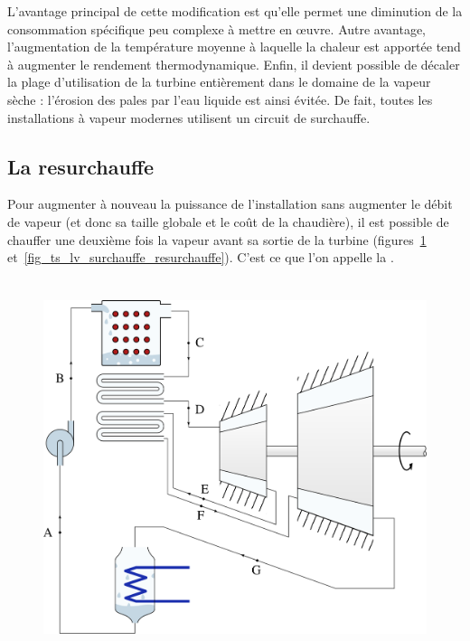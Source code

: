 		L’avantage principal de cette modification est qu’elle permet une diminution de la consommation spécifique peu complexe à mettre en œuvre. Autre avantage, l’augmentation de la température moyenne à laquelle la chaleur est apportée tend à augmenter le rendement thermodynamique. Enfin, il devient possible de décaler la plage d’utilisation de la turbine entièrement dans le domaine de la vapeur sèche : l’érosion des pales par l’eau liquide est ainsi évitée. De fait, toutes les installations à vapeur modernes utilisent un circuit de surchauffe.


	\subsection{La resurchauffe}
	\label{ch_resurchauffe}

		Pour augmenter à nouveau la puissance de l’installation sans augmenter le débit de vapeur (et donc sa taille globale et le coût de la chaudière), il est possible de chauffer une deuxième fois la vapeur avant sa sortie de la turbine (figures~\ref{fig_cycle_resurchauffe} et~\ref{fig_ts_lv_surchauffe_resurchauffe}). C’est ce que l’on appelle la .

		\begin{figure}
			\begin{center}
				\includegraphics[height=11cm]{images/circuit_surchauffe_resurchauffe.png}
			\end{center}
			\label{fig_cycle_resurchauffe}
		\end{figure}

